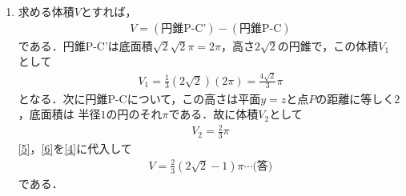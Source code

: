 \documentclass[a4j]{jarticle}
\begin{document}
\begin{multicols}{2}
\begin{enumerate}[(1)]
     \item 求める体積$V$とすれば，
          \begin{align}
          V=(\text{円錐P-C'})-(\text{円錐P-C}) \label{4}
          \end{align}
     である．円錐P-C'は底面積$\sqrt{2}\sqrt{2}\pi=2\pi$，高さ$2\sqrt{2}$の円錐で，この体積$V_1$
     として
          \begin{align}
          V_1=\frac{1}{3}(2\sqrt{2})(2\pi)=\frac{4\sqrt{2}}{3}\pi  \label{5}
          \end{align}
     となる．次に円錐P-Cについて，この高さは平面$y=z$と点$P$の距離に等しく$2$，底面積は
     半径$1$の円のそれ$\pi$である．故に体積$V_2$として
          \begin{align}
          V_2=\frac{2}{3}\pi \label{6}
          \end{align}
     \eqref{5}，\eqref{6}を\eqref{4}に代入して
          \begin{align*}
          V=\frac{2}{3}(2\sqrt{2}-1)\pi\cdots\text{(答)} 
          \end{align*}
     である．
     \end{enumerate}
\newpage
\end{multicols}
\end{document}
